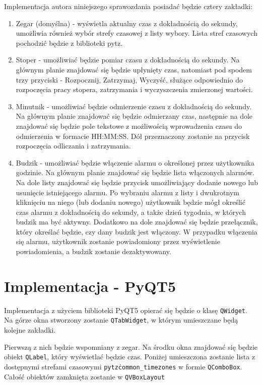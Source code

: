 \documentclass[11pt]{article}
\begin{document}
    Implementacja autora niniejszego sprawozdania posiadać będzie cztery zakładki:
    \begin{enumerate}
        \item Zegar (domyślna) - wyświetla aktualny czas z dokładnością do sekundy,
        umożliwia również wybór strefy czasowej z listy wybory.
        Lista stref czasowych pochodzić będzie z biblioteki pytz.
        \item Stoper - umożliwiać będzie pomiar czasu z dokładnością do sekundy.
        Na głównym planie znajdować się będzie upłynięty czas, natomiast pod spodem
        trzy przyciski - Rozpocznij, Zatrzymaj, Wyczyść, służące odpowiednio do 
        rozpoczęcia pracy stopera, zatrzymania i wyczyszczenia zmierzonej wartości.
        \item Minutnik - umożliwiać będzie odmierzenie czasu z dokładnością do sekundy.
        Na głównym planie znajdować się będzie odmierzany czas, następnie na dole znajdować się
        będzie pole tekstowe z możliwością wprowadzenia czasu do odmierzenia w formacie HH:MM:SS.
        Dół przeznaczony zostanie na przycisk rozpoczęcia odliczania i zatrzymania.
        \item Budzik - umożliwiać będzie włączenie alarmu o określonej przez użytkownika godzinie.
        Na głównym planie znajdować się będzie lista włączonych alarmów. Na dole listy znajdować
        się będzie przycisk umożliwiający dodanie nowego lub usunięcie istniejącego alarmu. 
        Po wybraniu alarmu z listy i dwukrotnym kliknięciu na niego (lub dodaniu nowego)
        użytkownik będzie mógł określić czas alarmu z dokładnością do sekundy, a także dzień tygodnia, w których
        budzik ma być aktywny. Dodatkowo na dole znajdować się będzie przełącznik, który określać będzie,
        czy dany budzik jest włączony. W przypadku włączenia się alarmu,
        użytkownik zostanie powiadomiony przez wyświetlenie powiadomienia, a budzik zostanie dezaktywowany.
    \end{enumerate}

    \section{Implementacja - PyQT5}
    Implementacja z użyciem biblioteki PyQT5 opierać się będzie o klasę \texttt{QWidget}.
    Na górze okna stworzony zostanie \texttt{QTabWidget}, w którym umieszczane będą kolejne zakładki.

    Pierwszą z nich będzie wspomniany z zegar. Na środku okna znajdować się będzie obiekt \texttt{QLabel},
    który wyświetlać będzie czas. Poniżej umieszczona zostanie lista z dostępnymi strefami czasowymi 
    \texttt{pytz\.common\_timezones} w formie \texttt{QComboBox}. Całość obiektów zamknięta zostanie
    w \texttt{QVBoxLayout}
\end{document}
